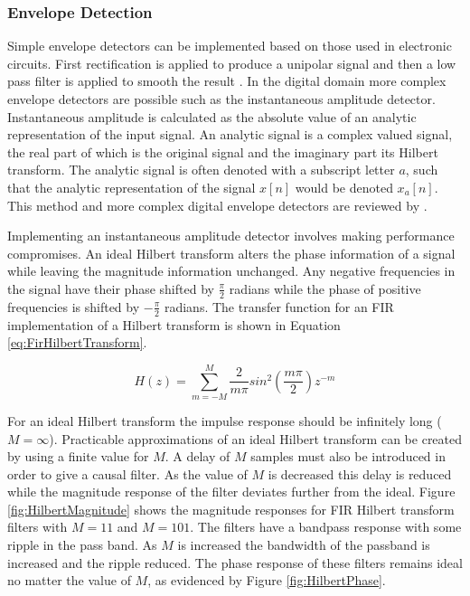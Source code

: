 		\subsubsection*{Envelope Detection}
			Simple envelope detectors can be implemented based on those used in electronic circuits. First
			rectification is applied to produce a unipolar signal and then a low pass filter is applied to
			smooth the result \citep{dutilleux2011modulators}. In the digital domain more complex envelope
			detectors are possible such as the instantaneous amplitude detector. Instantaneous amplitude is
			calculated as the absolute value of an analytic representation of the input signal. An analytic
			signal is a complex valued signal, the real part of which is the original signal and the imaginary
			part its Hilbert transform. The analytic signal is often denoted with a subscript letter $a$, such
			that the analytic representation of the signal $x[n]$ would be denoted $x_{a}[n]$. This method and
			more complex digital envelope detectors are reviewed by \citet{chang2007a}. 

			Implementing an instantaneous amplitude detector involves making performance compromises. An ideal
			Hilbert transform alters the phase information of a signal while leaving the magnitude information
			unchanged. Any negative frequencies in the signal have their phase shifted by $\frac{\pi}{2}$
			radians while the phase of positive frequencies is shifted by $-\frac{\pi}{2}$ radians. The
			transfer function for an FIR implementation of a Hilbert transform is shown in Equation
			\ref{eq:FirHilbertTransform}.

			\begin{equation}
				H(z) = \sum_{m = -M}^{M} \frac{2}{m\pi} sin^{2} \left( \frac{m\pi}{2} \right) z^{-m}
				\label{eq:FirHilbertTransform}
			\end{equation}

			For an ideal Hilbert transform the impulse response should be infinitely long ($M = \infty$).
			Practicable approximations of an ideal Hilbert transform can be created by using a finite value for
			$M$. A delay of $M$ samples must also be introduced in order to give a causal filter. As the value
			of $M$ is decreased this delay is reduced while the magnitude response of the filter deviates
			further from the ideal. Figure \ref{fig:HilbertMagnitude} shows the magnitude responses for FIR
			Hilbert transform filters with $M = 11$ and $M = 101$. The filters have a bandpass response with
			some ripple in the pass band. As $M$ is increased the bandwidth of the passband is increased and
			the ripple reduced. The phase response of these filters remains ideal no matter the value of $M$,
			as evidenced by Figure \ref{fig:HilbertPhase}.

